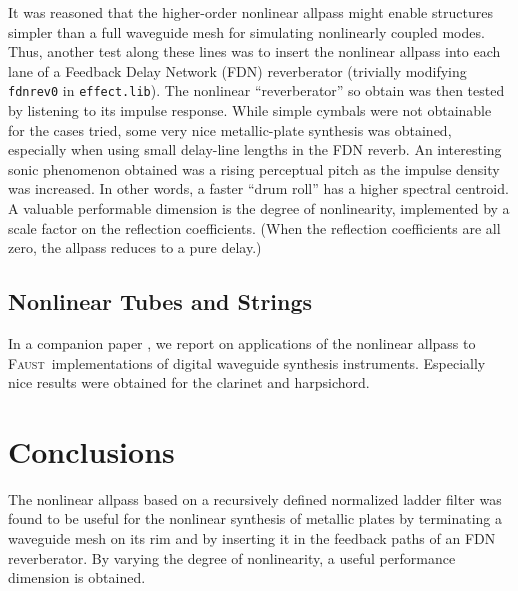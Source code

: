 \documentclass[twoside,a4paper]{article}
\newcommand{\Faust}{\textsc{Faust}}
\newcommand{\Faustsp}{\Faust\ }
\begin{document}
It was reasoned that the higher-order nonlinear allpass might enable
structures simpler than a full waveguide mesh for simulating
nonlinearly coupled modes.  Thus, another test along these lines was
to insert the nonlinear allpass into each lane of a Feedback Delay
Network (FDN) reverberator (trivially modifying \texttt{fdnrev0} in
\texttt{effect.lib}).  The nonlinear ``reverberator'' so obtain was
then tested by listening to its impulse response.  While simple
cymbals were not obtainable for the cases tried, some very nice
metallic-plate synthesis was obtained, especially when using small
delay-line lengths in the FDN reverb.  An interesting sonic phenomenon
obtained was a rising perceptual pitch as the impulse density was
increased.  In other words, a faster ``drum roll'' has a higher
spectral centroid.  A valuable performable dimension is the degree of
nonlinearity, implemented by a scale factor on the reflection
coefficients.  (When the reflection coefficients are all zero, the
allpass reduces to a pure delay.)

\subsection{Nonlinear Tubes and Strings}

In a companion paper \cite{FAUST-STK}, we report on applications of
the nonlinear allpass to \Faustsp implementations of digital waveguide
synthesis instruments.  Especially nice results were obtained for the
clarinet and harpsichord.

\section{Conclusions}

The nonlinear allpass based on a recursively defined normalized ladder
filter was found to be useful for the nonlinear synthesis of metallic
plates by terminating a waveguide mesh on its rim and by inserting it
in the feedback paths of an FDN reverberator.  By varying the degree
of nonlinearity, a useful performance dimension is obtained.

{%
\raggedright
\nocite{*}


}
\end{document}
